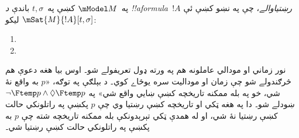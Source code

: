 \documentclass[../../../include/open-logic-section]{subfiles}
\begin{document}
\begin{defn}
  په~$\mModel M$ کښې په~$t, \sigma$ باندې \emph{د !!a{formula}~$!A$
  رښتياوالے}، چې په نښو کښې ئې $\mSat{M}{!A}[t, \sigma]$ ليکو:
  \begin{enumerate}
  \item{} 
  \item{} 
  \end{enumerate}
\end{defn}

نور زماني او مودالي عاملونه هم په ورته ډول تعريفولے شو۔ اوس بيا هغه
دعوې هم څرګندولے شو چې زمان او موداليت سره يوځاے کوي۔ د بېلګې په
توګه، «$p$ به واقع نۀ شي، خو په بله ممکنه تاريخچه کښې ښايي واقع شي»
په $\lnot \Ftemp p \land \Diamond \Ftemp p$ ښودلے شو۔ دا په هغه
ټکي او تاريخچه کښې رښتيا وي چې $p$ پکښې په راتلونکي حالت کښې رښتيا
نۀ شي، او له همدې ټکي تېرېدونکې بله ممکنه تاريخچه شته چې $p$
به پکښې په راتلونکي حالت کښې رښتيا شي۔
\end{document}
